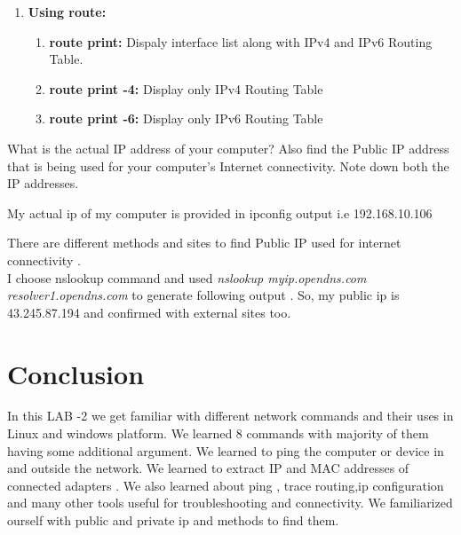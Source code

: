 \documentclass[a4paper,12pt]{article}
\begin{document}
\begin{enumerate}
\begin{enumerate}
          \end{enumerate}

    \item \textbf{Using route:}
          \begin{enumerate}
              \item \textbf{route print:}
                    Dispaly interface list along with IPv4 and IPv6 Routing Table.


              \item \textbf{route print -4:}
                    Display only IPv4 Routing Table


              \item \textbf{route print -6:}
                    Display only IPv6 Routing Table

          \end{enumerate}

\end{enumerate}


\pagebreak

\begin{Q}
    {What is the actual IP address of your computer? Also find the Public IP address that is being
        used for your computer’s Internet connectivity. Note down both the IP addresses.}
\end{Q}
\begin{A}
    {
        My actual ip of my computer is provided in ipconfig output i.e 192.168.10.106


        There are different methods and sites to find Public IP used for internet connectivity .\\

        I choose  nslookup  command  and used \textit{nslookup myip.opendns.com resolver1.opendns.com}
        to generate following output . So, my public ip is 43.245.87.194 and confirmed with external sites too.


    }
\end{A}



\section{Conclusion}
In this LAB -2 we get familiar with different network commands and their uses in Linux and windows platform.
We learned 8 commands with majority of them having some additional argument.
We learned to ping the computer or device in and outside the network. We learned to extract IP and MAC addresses of connected adapters .
We also learned about ping , trace routing,ip configuration and many other tools useful for troubleshooting and connectivity.
We familiarized ourself with public and private ip and methods to find them.
\end{document}
